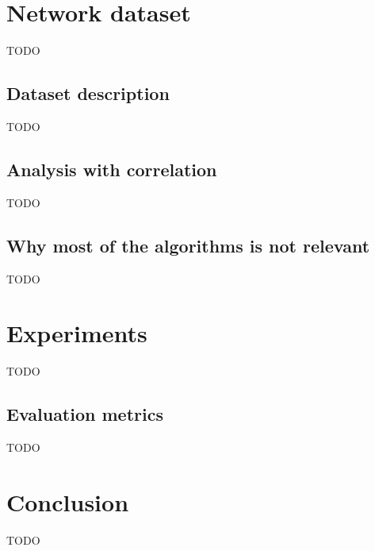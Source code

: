 \documentclass[11pt]{article}
\begin{document}
  \section{Network dataset}
    {\color{red}TODO}
    \subsection{Dataset description}
      {\color{red}TODO}
    \subsection{Analysis with correlation}
      {\color{red}TODO}
    \subsection{Why most of the algorithms is not relevant}
      {\color{red}TODO}
  \newpage
  \section{Experiments}
    {\color{red}TODO}
    \subsection{Evaluation metrics}
      {\color{red}TODO}
  \newpage
  \section*{Conclusion}
    {\color{red}TODO}
  \newpage
\end{document}
